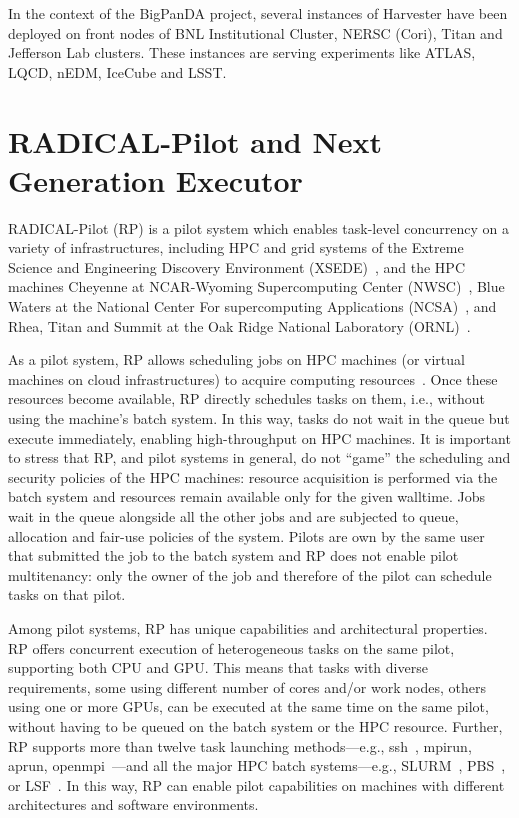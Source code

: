 \documentclass{webofc}
\begin{document}
In the context of the BigPanDA project, several instances of Harvester have
been deployed on front nodes of BNL Institutional Cluster, NERSC (Cori),
Titan and Jefferson Lab clusters. These instances are serving experiments
like ATLAS, LQCD, nEDM, IceCube and LSST.


\section{RADICAL-Pilot and Next Generation Executor}\label{sec:rp}

RADICAL-Pilot (RP) is a pilot system which enables task-level concurrency on
a variety of infrastructures, including HPC and grid systems of the Extreme
Science and Engineering Discovery Environment (XSEDE)~\citep{towns2014xsede},
and the HPC machines Cheyenne at NCAR-Wyoming Supercomputing Center
(NWSC)~\citep{cheyenne}, Blue Waters at the National Center For supercomputing
Applications (NCSA)~\citep{bluewaters}, and Rhea, Titan and Summit at the Oak
Ridge National Laboratory (ORNL)~\citep{olcf-resources}.

As a pilot system, RP allows scheduling jobs on HPC machines (or virtual
machines on cloud infrastructures) to acquire computing
resources~\citep{turilli2018comprehensive}. Once these resources become
available, RP directly schedules tasks on them, i.e., without using the
machine’s batch system. In this way, tasks do not wait in the queue but
execute immediately, enabling high-throughput on HPC machines. It is
important to stress that RP, and pilot systems in general, do not ``game''
the scheduling and security policies of the HPC machines: resource
acquisition is performed via the batch system and resources remain available
only for the given walltime. Jobs wait in the queue alongside all the other
jobs and are subjected to queue, allocation and fair-use policies of the
system. Pilots are own by the same user that submitted the job to the batch
system and RP does not enable pilot multitenancy: only the owner of the job
and therefore of the pilot can schedule tasks on that pilot.
	
Among pilot systems, RP has unique capabilities and architectural properties.
RP offers concurrent execution of heterogeneous tasks on the same pilot,
supporting both CPU and GPU. This means that tasks with diverse requirements,
some using different number of cores and/or work nodes, others using one or
more GPUs, can be executed at the same time on the same pilot, without having
to be queued on the batch system or the HPC resource. Further, RP supports
more than twelve task launching methods---e.g., ssh~\citep{ssh}, mpirun,
aprun, openmpi~\citep{gropp1999using}---and all the major HPC batch
systems---e.g., SLURM~\citep{yoo2003slurm}, PBS~\citep{henderson1995job}, or
LSF~\citep{zhou1992lsf}. In this way, RP can enable pilot capabilities on
machines with different architectures and software environments.
\end{document}

